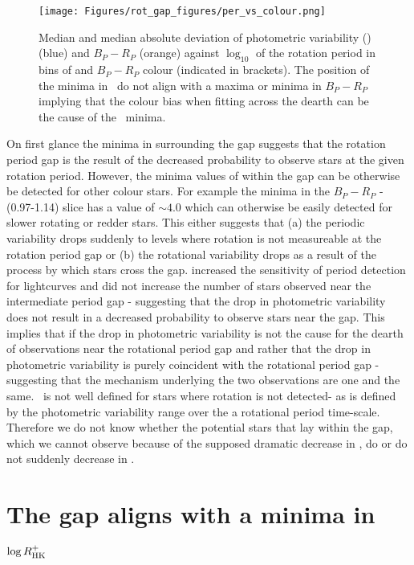 \begin{figure}
\centering
    \texttt{[image: Figures/rot\_gap\_figures/per\_vs\_colour.png]}
    \caption{
    Median and median absolute deviation of photometric variability (\rper{}) (blue) and $B_P-R_P$ (orange) against $\log_10$ of the rotation period in bins of and \gaia{} $B_P-R_P$ colour (indicated in brackets). The position of the minima in \rper{} \ do not align with a maxima or minima in $B_P-R_P$ implying that the colour bias when fitting across the dearth can be the cause of the \rper{} \ minima.}
    \label{fig:colour_rper}
\end{figure}


On first glance the minima in \rper{} surrounding the gap suggests that the rotation period gap is the result of the decreased probability to observe stars at the given rotation period.
However, the minima values of \rper{} within the gap can be otherwise be detected for other colour stars.
For example the minima in the $B_P-R_P$ - (0.97-1.14) slice has a \rper{} value of $\sim 4.0$ which can otherwise be easily detected for slower rotating or redder stars.
This either suggests that (a) the periodic variability drops suddenly to levels where rotation is not measureable at the rotation period gap or (b) the rotational variability drops as a result of the process by which stars cross the gap. 
 \citet{santos_surface_2021} increased the sensitivity of period detection for \kepler{} lightcurves and did not increase the number of stars observed near the intermediate period gap - suggesting that the drop in photometric variability does not result in a decreased probability to observe stars near the gap.
This implies that if the drop in photometric variability is not the cause for the dearth of observations near the rotational period gap and rather that the drop in photometric variability is purely coincident with the rotational period gap - suggesting that the mechanism underlying the two observations are one and the same.
\rper{} \ is not well defined for stars where rotation is not detected- as \rper{} is defined by the photometric variability range over the a rotational period time-scale.
Therefore we do not know whether the potential stars that lay within the gap, which we cannot observe because of the supposed dramatic decrease in \rper{}, do or do not suddenly decrease in \rper{}.

\section{The gap aligns with a minima in $\log R^{+}_{\rm{HK}}$ }
\label{sec:minima_rhk}

